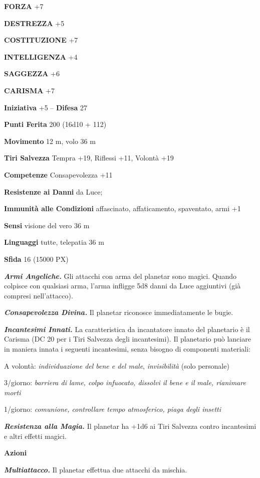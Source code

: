 \begin{multicols}{2}
	\textbf{FORZA} +7

	\textbf{DESTREZZA} +5

	\textbf{COSTITUZIONE} +7

	\textbf{INTELLIGENZA} +4

	\textbf{SAGGEZZA} +6

	\textbf{CARISMA} +7

	\textbf{Iniziativa} +5 -- \textbf{Difesa} 27

	\textbf{Punti Ferita} 200 (16d10 + 112)

	\textbf{Movimento} 12 m, volo 36 m

	\textbf{Tiri Salvezza} Tempra +19, Riflessi +11, Volontà +19

	\textbf{Competenze} Consapevolezza +11

	\textbf{Resistenze ai Danni} da Luce;

	\textbf{Immunità alle Condizioni} affascinato, affaticamento, spaventato, armi +1

	\textbf{Sensi} visione del vero 36 m

	\textbf{Linguaggi} tutte, telepatia 36 m

	\textbf{Sfida} 16 (15000 PX)

	\textit{\textbf{Armi Angeliche.}} Gli attacchi con arma del planetar sono magici. Quando colpisce con qualsiasi arma, l'arma infligge 5d8 danni da Luce aggiuntivi (già compresi nell'attacco).

	\textit{\textbf{Consapevolezza Divina.}} Il planetar riconosce immediatamente le bugie.

	\textit{\textbf{Incantesimi Innati.}} La caratteristica da incantatore innato del planetario è il Carisma (DC 20 per i Tiri Salvezza degli incantesimi). Il planetario può lanciare in maniera innata i seguenti incantesimi, senza bisogno di componenti materiali:

	A volontà: \textit{individuazione del bene e del male}, \textit{invisibilità} (solo personale)

	3/giorno: \textit{barriera di lame, colpo infuocato, dissolvi il bene e il} \textit{male, rianimare morti}

	1/giorno: \textit{comunione, controllare tempo atmosferico, piaga degli insetti}

	\textit{\textbf{Resistenza alla Magia.}} Il planetar ha +1d6 ai Tiri Salvezza contro incantesimi e altri effetti magici.

	\textbf{Azioni}

	\textit{\textbf{Multiattacco.}} Il planetar effettua due attacchi da mischia.


\end{multicols}
